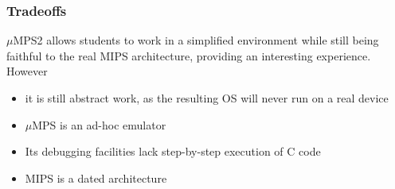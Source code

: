 \documentclass[table,xcdraw]{beamer}
\begin{document}
\begin{frame}
    \frametitle{Tradeoffs}
    $\mu$MPS2 allows students to work in a simplified environment while still being
    faithful to the real MIPS architecture, providing an interesting experience.
    However
    \begin{itemize}
        \item it is still abstract work, as the resulting OS will never run on a real device
        \item $\mu$MPS is an ad-hoc emulator
        \item Its debugging facilities lack step-by-step execution of C code
        \item MIPS is a dated architecture
    \end{itemize}

\end{frame}
\end{document}
